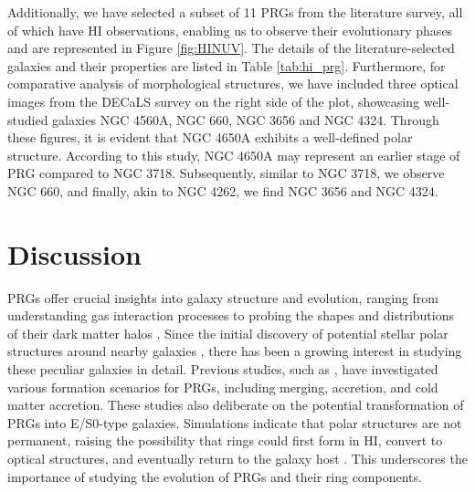 \documentclass{pas}
\begin{document}
Additionally, we have selected a subset of 11 PRGs from the literature survey, all of which have HI observations, enabling us to observe their evolutionary phases and are represented in Figure \ref{fig:HINUV}. The details of the literature-selected galaxies and their properties are listed in Table \ref{tab:hi_prg}. Furthermore, for comparative analysis of morphological structures, we have included three optical images from the DECaLS survey on the right side of the plot, showcasing well-studied galaxies NGC 4560A, NGC 660, NGC 3656 and NGC 4324. Through these figures, it is evident that NGC 4650A exhibits a well-defined polar structure. According to this study, NGC 4650A may represent an earlier stage of PRG compared to NGC 3718. Subsequently, similar to NGC 3718, we observe NGC 660, and finally, akin to NGC 4262, we find NGC 3656 and NGC 4324.
\section{Discussion}
\label{sec:disc}

PRGs offer crucial insights into galaxy structure and evolution, ranging from understanding gas interaction processes to probing the shapes and distributions of their dark matter halos \citep{1996Reshetnikov3808,reshkinov1997,1998Bekki,2003Bournaud_Combes,2006macci,2009Sparke,2014Khoperskov,2020Quiroga,2021Khoperskov,2024Smirnov}. Since the initial discovery of potential stellar polar structures around nearby galaxies \citep{1961Sandage},  there has been a growing interest in studying these peculiar galaxies in detail. Previous studies, such as \cite{1998Bekki,2003Bournaud_Combes,2008ApJ...689..678B}, have investigated various formation scenarios for PRGs, including merging, accretion, and cold matter accretion. These studies also deliberate on the potential transformation of PRGs into E/S0-type galaxies. Simulations indicate that polar structures are not permanent, raising the possibility that rings could first form in HI, convert to optical structures, and eventually return to the galaxy host \citep{2003Bournaud_Combes,2021Khoperskov,2023Degwallaby}. This underscores the importance of studying the evolution of PRGs and their ring components.\par
\end{document}
